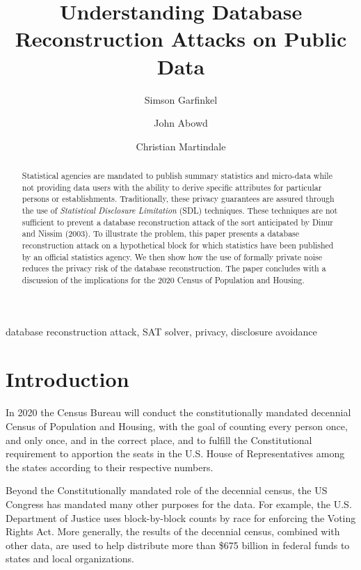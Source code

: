 \documentclass[runningheads]{llncs}
\newif\ifshortversion
\begin{document}
\title{Understanding Database Reconstruction Attacks on Public Data}
\author{Simson Garfinkel \and John Abowd \and Christian Martindale }

\maketitle
\begin{abstract}
Statistical agencies are mandated to publish summary statistics and
micro-data while not providing data users with the ability to derive
specific attributes for particular persons or
establishments. 
Traditionally, these privacy guarantees are assured through the
use of \emph{Statistical Disclosure Limitation} (SDL)
techniques. These techniques are not sufficient to
prevent a database reconstruction attack of the sort anticipated by
Dinur and Nissim (2003). To illustrate the problem, this paper
presents a database reconstruction attack on a hypothetical block for
which statistics have been published by an official statistics
agency. We then show how the use of formally private noise reduces the
privacy risk of the database reconstruction. The paper concludes with
a discussion of the implications for the 2020 Census of Population and
Housing. 
\end{abstract}

\begin{keywords}
database reconstruction attack, SAT solver, 
\ifshortversion\else privacy,\fi 
disclosure avoidance
\end{keywords}

\section{Introduction}
In 2020 the Census Bureau will conduct the constitutionally mandated
decennial Census of Population and Housing, with the goal of counting
every person once, and only once, and in the correct place, and to
fulfill the Constitutional requirement to apportion the seats in the
U.S. House of Representatives among the states according to their
respective numbers.

Beyond the Constitutionally mandated role of the decennial census, the
US Congress has mandated many other purposes for the data. For
example, the U.S. Department of Justice uses block-by-block counts by
race for enforcing the Voting Rights Act. More generally, the results
of the decennial census, combined with other data, are used to help
distribute more than \$675 billion in federal funds to states and
local organizations.
\end{document}
